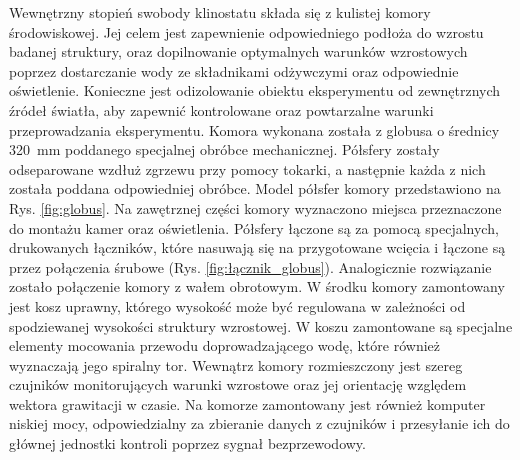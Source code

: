 Wewnętrzny stopień swobody klinostatu składa się z kulistej komory środowiskowej. Jej celem jest zapewnienie odpowiedniego podłoża do wzrostu badanej struktury, oraz dopilnowanie optymalnych warunków wzrostowych poprzez dostarczanie wody ze składnikami odżywczymi oraz odpowiednie oświetlenie. Konieczne jest odizolowanie obiektu eksperymentu od zewnętrznych źródeł światła, aby zapewnić kontrolowane oraz powtarzalne warunki przeprowadzania eksperymentu. Komora wykonana została z globusa o średnicy \SI{320}{mm} poddanego specjalnej obróbce mechanicznej. Półsfery zostały odseparowane wzdłuż zgrzewu przy pomocy tokarki, a następnie każda z nich została poddana odpowiedniej obróbce. Model półsfer komory przedstawiono na Rys. \ref{fig:globus}. Na zawętrznej części komory wyznaczono miejsca przeznaczone do montażu kamer oraz oświetlenia. Półsfery łączone są za pomocą specjalnych, drukowanych łączników, które nasuwają się na przygotowane wcięcia i łączone są przez połączenia śrubowe (Rys. \ref{fig:łącznik_globus}). Analogicznie rozwiązanie zostało połączenie komory z wałem obrotowym. W środku komory zamontowany jest kosz uprawny, którego wysokość może być regulowana w zależności od spodziewanej wysokości struktury wzrostowej. W koszu zamontowane są specjalne elementy mocowania przewodu doprowadzającego wodę, które również wyznaczają jego spiralny tor. Wewnątrz komory rozmieszczony jest szereg czujników monitorujących warunki wzrostowe oraz jej orientację względem wektora grawitacji w czasie. Na komorze zamontowany jest również komputer niskiej mocy, odpowiedzialny za zbieranie danych z czujników i przesyłanie ich do głównej jednostki kontroli poprzez sygnał bezprzewodowy.

